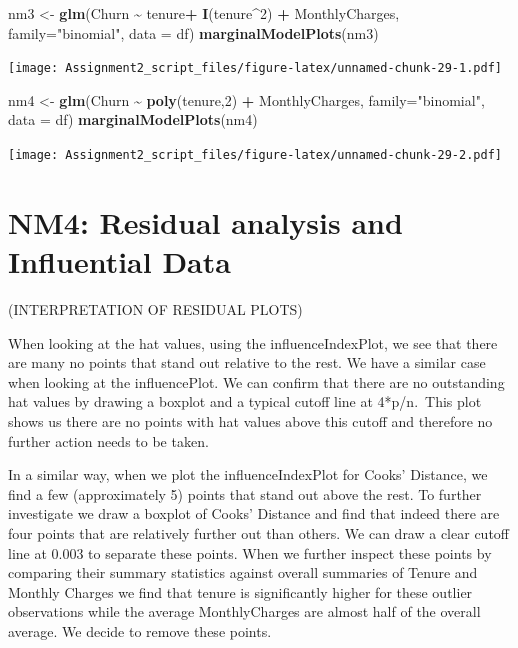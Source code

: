 \documentclass[
]{article}
\newenvironment{Shaded}{\begin{snugshade}}{\end{snugshade}}
\newcommand{\AttributeTok}[1]{\textcolor[rgb]{0.13,0.29,0.53}{#1}}
\newcommand{\DecValTok}[1]{\textcolor[rgb]{0.00,0.00,0.81}{#1}}
\newcommand{\FunctionTok}[1]{\textcolor[rgb]{0.13,0.29,0.53}{\textbf{#1}}}
\newcommand{\NormalTok}[1]{#1}
\newcommand{\OtherTok}[1]{\textcolor[rgb]{0.56,0.35,0.01}{#1}}
\newcommand{\SpecialCharTok}[1]{\textcolor[rgb]{0.81,0.36,0.00}{\textbf{#1}}}
\newcommand{\StringTok}[1]{\textcolor[rgb]{0.31,0.60,0.02}{#1}}
\begin{document}
\begin{Shaded}
\begin{Highlighting}[]
\NormalTok{nm3 }\OtherTok{\textless{}{-}} \FunctionTok{glm}\NormalTok{(Churn }\SpecialCharTok{\textasciitilde{}}\NormalTok{ tenure}\SpecialCharTok{+} \FunctionTok{I}\NormalTok{(tenure}\SpecialCharTok{\^{}}\DecValTok{2}\NormalTok{) }\SpecialCharTok{+}\NormalTok{ MonthlyCharges, }\AttributeTok{family=}\StringTok{"binomial"}\NormalTok{, }\AttributeTok{data =}\NormalTok{ df)}
\FunctionTok{marginalModelPlots}\NormalTok{(nm3)}
\end{Highlighting}
\end{Shaded}

\texttt{[image: Assignment2\_script\_files/figure-latex/unnamed-chunk-29-1.pdf]}

\begin{Shaded}
\begin{Highlighting}[]
\NormalTok{nm4 }\OtherTok{\textless{}{-}} \FunctionTok{glm}\NormalTok{(Churn }\SpecialCharTok{\textasciitilde{}} \FunctionTok{poly}\NormalTok{(tenure,}\DecValTok{2}\NormalTok{) }\SpecialCharTok{+}\NormalTok{ MonthlyCharges, }\AttributeTok{family=}\StringTok{"binomial"}\NormalTok{, }\AttributeTok{data =}\NormalTok{ df)}
\FunctionTok{marginalModelPlots}\NormalTok{(nm4)}
\end{Highlighting}
\end{Shaded}

\texttt{[image: Assignment2\_script\_files/figure-latex/unnamed-chunk-29-2.pdf]}

\hypertarget{nm4-residual-analysis-and-influential-data}{%
\section{NM4: Residual analysis and Influential
Data}\label{nm4-residual-analysis-and-influential-data}}

(INTERPRETATION OF RESIDUAL PLOTS)

When looking at the hat values, using the influenceIndexPlot, we see
that there are many no points that stand out relative to the rest. We
have a similar case when looking at the influencePlot. We can confirm
that there are no outstanding hat values by drawing a boxplot and a
typical cutoff line at 4*p/n.~This plot shows us there are no points
with hat values above this cutoff and therefore no further action needs
to be taken.

In a similar way, when we plot the influenceIndexPlot for Cooks'
Distance, we find a few (approximately 5) points that stand out above
the rest. To further investigate we draw a boxplot of Cooks' Distance
and find that indeed there are four points that are relatively further
out than others. We can draw a clear cutoff line at 0.003 to separate
these points. When we further inspect these points by comparing their
summary statistics against overall summaries of Tenure and Monthly
Charges we find that tenure is significantly higher for these outlier
observations while the average MonthlyCharges are almost half of the
overall average. We decide to remove these points.
\end{document}
